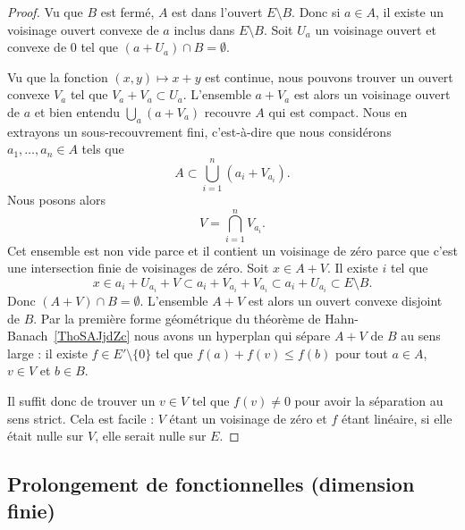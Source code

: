 \begin{proof}
	Vu que \( B\) est fermé, \( A\) est dans l'ouvert \( E\setminus B\). Donc si \( a\in A\), il existe un voisinage ouvert convexe de \( a\) inclus dans \( E\setminus B\). Soit \( U_a\) un voisinage ouvert et convexe de \( 0\) tel que \( (a+U_a)\cap B=\emptyset\).

	Vu que la fonction \( (x,y)\mapsto x+y\) est continue, nous pouvons trouver un ouvert convexe \( V_a\) tel que \( V_a+V_a\subset U_a\). L'ensemble \( a+V_a\) est alors un voisinage ouvert de \( a\) et bien entendu \( \bigcup_a(a+V_a)\) recouvre \( A\) qui est compact. Nous en extrayons un sous-recouvrement fini, c'est-à-dire que nous considérons \( a_1,\ldots, a_n\in A\) tels que
	\begin{equation}
		A\subset \bigcup_{i=1}^n(a_i+V_{a_i}).
	\end{equation}
	Nous posons alors
	\begin{equation}
		V=\bigcap_{i=1}^nV_{a_i}.
	\end{equation}
	Cet ensemble est non vide parce et il contient un voisinage de zéro parce que c'est une intersection finie de voisinages de zéro. Soit \( x\in A+V\). Il existe \( i\) tel que
	\begin{equation}
		x\in a_i+U_{a_i}+V\subset a_i+V_{a_i}+V_{a_i}\subset a_i+U_{a_i}\subset E\setminus B.
	\end{equation}
	Donc \( (A+V)\cap B=\emptyset\). L'ensemble \( A+V\) est alors un ouvert convexe disjoint de \( B\). Par la première forme géométrique du théorème de Hahn-Banach~\ref{ThoSAJjdZc} nous avons un hyperplan qui sépare \( A+V\) de \( B\) au sens large : il existe \( f\in E'\setminus\{ 0 \}\) tel que \( f(a)+f(v)\leq f(b)\) pour tout \( a\in A\), \( v\in V\) et \( b\in B\).

	Il suffit donc de trouver un \( v\in V\) tel que \( f(v)\neq 0\) pour avoir la séparation au sens strict. Cela est facile : \( V\) étant un voisinage de zéro et \( f\) étant linéaire, si elle était nulle sur \( V\), elle serait nulle sur \( E\).
\end{proof}

\subsection{Prolongement de fonctionnelles (dimension finie)}

